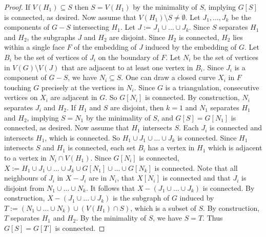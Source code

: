 \documentclass[11pt]{article}
\theoremstyle{plain}
\theoremstyle{definition}
\begin{document}
		\begin{proof}
			If $V(H_1)\subseteq S$ then $S=V(H_1)$ by the minimality of $S$, implying $G[S]$ is connected, as desired. 
			Now assume that $V(H_1)\setminus S\neq\emptyset$.
			Let $J_1,\dots,J_k$ be the components of $G-S$ intersecting $H_1$. Let $J:=J_1\cup\dots\cup J_k$. 
			Since $S$ separates $H_1$ and $H_2$, the subgraphs $J$ and $H_2$ are disjoint. Since $H_2$ is connected, $H_2$ lies within a single face $F$ of the embedding of $J$ induced by the embedding of $G$. 
			Let $B_i$ be the set of vertices of $J_i$ on the boundary of $F$. Let $N_i$ be the set of vertices in $V(G)\setminus V(J)$ that are adjacent to at least one vertex in $B_i$. Since $J_i$ is a component of $G-S$, we have $N_i\subseteq S$. One can draw a closed curve $X_i$ in $F$ touching $G$ precisely at the vertices in $N_i$. Since $G$ is a triangulation, consecutive vertices on $X_i$ are adjacent in $G$. So $G[N_i]$ is connected. By construction, $N_i$ separates $J_i$ and $H_2$. 
			If $H_1$ and $S$ are disjoint, then $k=1$ and $N_1$ separates $H_1$ and $H_2$, implying $S=N_1$ by the minimality of $S$, and $G[S]=G[N_1]$ is connected, as desired. Now assume that $H_1$ intersects $S$. 
			Each $J_i$ is connected and intersects $H_1$, which is connected. 
			So $H_1\cup J_1\cup\dots\cup J_k$ is connected. 
			Since  $H_1$ intersects $S$ and $H_1$ is connected, each set $B_i$ has a vertex in $H_1$ which is adjacent to a vertex in $N_i\cap V(H_1)$. Since $G[N_i]$ is connected, $X:=H_1\cup J_1\cup\dots\cup J_k\cup G[N_1]\cup \dots\cup G[N_k]$ is connected.
			Note that all neighbours of $J_i$ in $X-J_i$ are in $N_i$, that $X[N_i]$ is connected and that $J_i$ is disjoint from $N_1\cup\dots\cup N_k$.
			It follows that $X-(J_1\cup\dots\cup J_k)$ is connected.
			By construction, $X-(J_1\cup\dots\cup J_k)$ is the subgraph of $G$ induced by $T:=(N_1\cup \dots\cup N_k)\cup(V(H_1)\cap S)$, which is a subset of $S$. 
			By construction, $T$ separates $H_1$ and $H_2$. By the minimality of $S$, we have $S=T$. Thus $G[S]=G[T]$ is connected.
		\end{proof}
		
\end{document}
